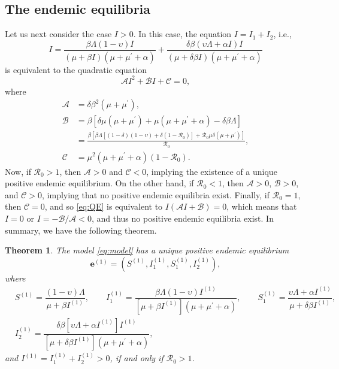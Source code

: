 \documentclass[11pt,reqno]{amsart}
\newtheorem{theorem}{Theorem}
\newcommand{\cR}{\mathcal{R}}
\begin{document}
\subsection{The endemic equilibria}

Let us next consider the case $I>0$. In this case, the equation $I=I_1 + I_2$, i.e.,
$$I=\dfrac{\beta\Lambda\left(1-\upsilon\right)I}{\left(\mu+\beta I\right)\left(\mu+\mu^\prime+\alpha\right)}+\dfrac{\delta\beta\left(\upsilon\Lambda+\alpha I\right)I}{\left(\mu+\delta\beta I\right)\left(\mu+\mu^\prime+\alpha\right)}$$
is equivalent to the quadratic equation
\begin{equation}\label{eq:QE}
\mathcal{A}I^2 + \mathcal{B}I + \mathcal{C}=0,
\end{equation}
where
\begin{align}
\mathcal{A} &=\delta \beta ^{2}\left( \mu +\mu ^{\prime }\right), \label{eq:A} \\
\mathcal{B} &=\beta \left[ \delta \mu \left( \mu +\mu ^{\prime }\right) +\mu\left(\mu +\mu ^{\prime }+\alpha\right) -\delta
\beta \Lambda \right]\nonumber\\
&=\frac{\beta \left[ \beta \Lambda \left[ \left( 1-\delta \right) \left(
1-\upsilon \right) +\delta \left( 1-\cR_0\right)
\right] +\cR_0\mu \delta \left( \mu +\mu ^{\prime
}\right) \right] }{\cR_0}, \label{eq:B}\\
\mathcal{C} &=\mu ^{2}\left(\mu +\mu ^{\prime }+\alpha\right)\left( 1-\cR_0\right).\label{eq:C}
\end{align}
Now, if $\mathcal{R}_0>1$, then $\mathcal{A}>0$ and $\mathcal{C}<0$, implying the existence of a unique positive endemic equilibrium. On the other hand, if $\mathcal{R}_0<1$, then $\mathcal{A}>0$, $\mathcal{B}>0$, and $\mathcal{C}>0$, implying that no positive endemic equilibria exist. Finally, if $\mathcal{R}_0=1$, then $\mathcal{C}=0$, and so \eqref{eq:QE} is equivalent to $I\left(\mathcal{A} I +\mathcal{B}\right)=0$, which means that $I=0$ or $I=-\mathcal{B}/\mathcal{A}<0$, and thus no positive endemic equilibria exist. In summary, we have the following theorem.\smallskip

\begin{theorem}\label{thm:EE}
The model \eqref{eq:model} has a unique positive endemic equilibrium $$\mathbf{e}^{\left(1\right)}=\left( S^{\left( 1\right) },I_{1}^{\left( 1\right)
},S_{1}^{\left( 1\right) },I_{2}^{\left( 1\right) }\right),$$ 
where
\begin{eqnarray*}
&S^{(1)}=\dfrac{\left(1-\upsilon\right)\Lambda}{\mu+\beta I^{(1)}},\qquad I_1^{(1)}=\dfrac{\beta\Lambda\left(1-\upsilon\right)I^{(1)}}{\left[\mu+\beta I^{(1)}\right]\left(\mu+\mu^\prime+\alpha\right)},\qquad S_1^{(1)}=\dfrac{\upsilon\Lambda + \alpha I^{(1)}}{\mu+\delta\beta I^{(1)}},&\\
&I_2^{(1)}=\dfrac{\delta\beta\left[\upsilon\Lambda+\alpha I^{(1)}\right]I^{(1)}}{\left[\mu+\delta\beta I^{(1)}\right]\left(\mu+\mu^\prime+\alpha\right)},&
\end{eqnarray*}
and $I^{(1)}=I_1^{(1)}+I_2^{(1)}>0$, if and only if $\mathcal{R}_0>1$.
\end{theorem}\smallskip
\end{document}
